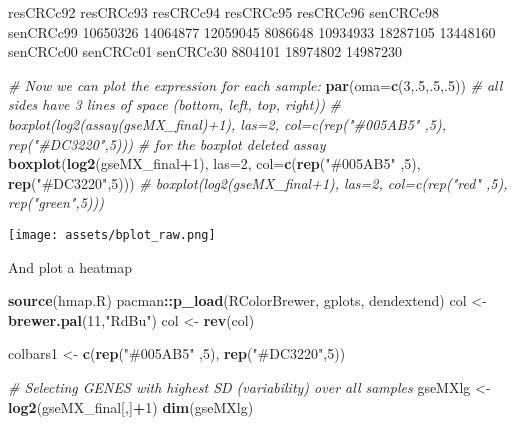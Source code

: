 \documentclass[
]{article}
\newenvironment{Shaded}{\begin{snugshade}}{\end{snugshade}}
\newcommand{\AttributeTok}[1]{\textcolor[rgb]{0.13,0.29,0.53}{#1}}
\newcommand{\CommentTok}[1]{\textcolor[rgb]{0.56,0.35,0.01}{\textit{#1}}}
\newcommand{\DecValTok}[1]{\textcolor[rgb]{0.00,0.00,0.81}{#1}}
\newcommand{\FunctionTok}[1]{\textcolor[rgb]{0.13,0.29,0.53}{\textbf{#1}}}
\newcommand{\NormalTok}[1]{#1}
\newcommand{\OtherTok}[1]{\textcolor[rgb]{0.56,0.35,0.01}{#1}}
\newcommand{\SpecialCharTok}[1]{\textcolor[rgb]{0.81,0.36,0.00}{\textbf{#1}}}
\newcommand{\StringTok}[1]{\textcolor[rgb]{0.31,0.60,0.02}{#1}}
\begin{document}
\begin{Shaded}
\begin{Highlighting}[]
\NormalTok{resCRCc92 resCRCc93 resCRCc94 resCRCc95 resCRCc96 senCRCc98 senCRCc99 }
\NormalTok{ 10650326  14064877  12059045   8086648  10934933  18287105  13448160 }
\NormalTok{senCRCc00 senCRCc01 senCRCc30 }
\NormalTok{  8804101  18974802  14987230 }
\end{Highlighting}
\end{Shaded}

\begin{Shaded}
\begin{Highlighting}[]
\CommentTok{\# Now we can plot the expression for each sample:}
\FunctionTok{par}\NormalTok{(}\AttributeTok{oma=}\FunctionTok{c}\NormalTok{(}\DecValTok{3}\NormalTok{,.}\DecValTok{5}\NormalTok{,.}\DecValTok{5}\NormalTok{,.}\DecValTok{5}\NormalTok{)) }\CommentTok{\# all sides have 3 lines of space (bottom, left, top, right)) }
\CommentTok{\# boxplot(log2(assay(gseMX\_final)+1), las=2, col=c(rep("\#005AB5" ,5), rep("\#DC3220",5)))}
\CommentTok{\# for the boxplot deleted \textquotesingle{}assay\textquotesingle{}  }
\FunctionTok{boxplot}\NormalTok{(}\FunctionTok{log2}\NormalTok{(gseMX\_final}\SpecialCharTok{+}\DecValTok{1}\NormalTok{), }\AttributeTok{las=}\DecValTok{2}\NormalTok{, }\AttributeTok{col=}\FunctionTok{c}\NormalTok{(}\FunctionTok{rep}\NormalTok{(}\StringTok{"\#005AB5"}\NormalTok{ ,}\DecValTok{5}\NormalTok{), }\FunctionTok{rep}\NormalTok{(}\StringTok{"\#DC3220"}\NormalTok{,}\DecValTok{5}\NormalTok{)))}
\CommentTok{\# boxplot(log2(gseMX\_final+1), las=2, col=c(rep("red" ,5), rep("green",5)))}
\end{Highlighting}
\end{Shaded}

\texttt{[image: assets/bplot\_raw.png]}

And plot a heatmap

\begin{Shaded}
\begin{Highlighting}[]
\FunctionTok{source}\NormalTok{(}\StringTok{\textquotesingle{}hmap.R\textquotesingle{}}\NormalTok{)}
\NormalTok{pacman}\SpecialCharTok{::}\FunctionTok{p\_load}\NormalTok{(RColorBrewer, gplots, dendextend)}
\NormalTok{col }\OtherTok{\textless{}{-}} \FunctionTok{brewer.pal}\NormalTok{(}\DecValTok{11}\NormalTok{,}\StringTok{"RdBu"}\NormalTok{)}
\NormalTok{col }\OtherTok{\textless{}{-}} \FunctionTok{rev}\NormalTok{(col)}

\NormalTok{colbars1 }\OtherTok{\textless{}{-}} \FunctionTok{c}\NormalTok{(}\FunctionTok{rep}\NormalTok{(}\StringTok{"\#005AB5"}\NormalTok{ ,}\DecValTok{5}\NormalTok{), }\FunctionTok{rep}\NormalTok{(}\StringTok{"\#DC3220"}\NormalTok{,}\DecValTok{5}\NormalTok{))}

\CommentTok{\# Selecting GENES with highest SD (variability) over all samples}
\NormalTok{gseMXlg }\OtherTok{\textless{}{-}} \FunctionTok{log2}\NormalTok{(gseMX\_final[,]}\SpecialCharTok{+}\DecValTok{1}\NormalTok{)}
\FunctionTok{dim}\NormalTok{(gseMXlg)}
\end{Highlighting}
\end{Shaded}
\end{document}
